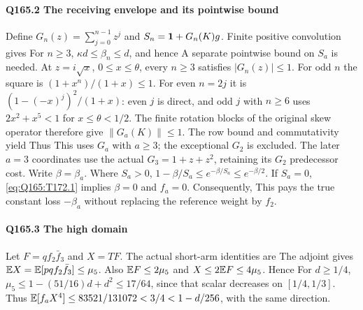 \paragraph{Q165.2 The receiving envelope and its pointwise bound}\label{part:Q165.2}
Define $G_n(z)=\allowbreak \sum_{j=\allowbreak 0}^{n-1}z^j$ and $S_n=\allowbreak \mathbf1+G_n(K)g$.
Finite positive convolution gives
For $n\ge\allowbreak 3$, $\kappa d\le\allowbreak \beta_n\le\allowbreak  d$, and hence
A separate pointwise bound on $S_a$ is needed. At $z=\allowbreak i\sqrt x$,
$0\le\allowbreak  x\le\allowbreak \theta$, every $n\ge\allowbreak 3$ satisfies $|G_n(z)|\le\allowbreak 1$.
For odd $n$ the square is $(1+x^n)/(1+x)\le\allowbreak 1$.
For even $n=\allowbreak 2j$ it is $(1-(-x)^j)^2/(1+x)$: even $j$ is direct,
and odd $j$ with $n\ge\allowbreak 6$ uses $2x^2+x^5<\allowbreak 1$ for $x\le\allowbreak \theta<\allowbreak 1/2$.
The finite rotation blocks of the original skew operator therefore give
$\|G_a(K)\|\le\allowbreak 1$. The row bound and commutativity yield
Thus
This uses $G_a$ with $a\ge\allowbreak 3$; the exceptional $G_2$ is excluded.
The later $a=\allowbreak 3$ coordinates use the actual $G_3=\allowbreak 1+z+z^2$, retaining
its $G_2$ predecessor cost.
Write $\beta=\allowbreak \beta_a$. Where $S_a>\allowbreak 0$,
$1-\beta/S_a\le\allowbreak  e^{-\beta/S_a}\le\allowbreak  e^{-\beta/2}$.
If $S_a=\allowbreak 0$, \eqref{eq:Q165:T172.1} implies $\beta=\allowbreak 0$ and $f_a=\allowbreak 0$.
Consequently,
This pays the true constant loss $-\beta_a$ without replacing the
reference weight by $f_2$.

\paragraph{Q165.3 The high domain}\label{part:Q165.3}
Let $F=\allowbreak qf_2\bar f_3$ and $X=\allowbreak TF$. The actual short-arm identities are
The adjoint gives $\mathbb E X=\allowbreak \mathbb E[pqf_2\bar f_3]\le\allowbreak \mu_5$.
Also $\mathbb E F\le\allowbreak 2\mu_5$ and $X\le\allowbreak 2\mathbb E F\le\allowbreak 4\mu_5$. Hence
For $d\ge\allowbreak 1/4$,
$\mu_5\le\allowbreak 1-(51/16)d+d^2\le\allowbreak 17/64$, since that scalar decreases on
$[1/4,\allowbreak 1/3]$. Thus $\mathbb E[f_aX^4]\le\allowbreak 83521/131072<\allowbreak 3/4<\allowbreak 1-d/256$,
with the same direction.

